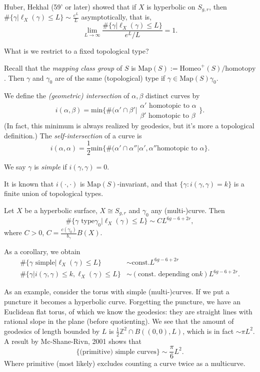 Huber, Hekhal (59' or later) showed that if
$X$ is hyperbolic
on $S_{g,r}$, then
$\#\{\gamma|\ell_X(\gamma)\leq L\}\sim
\frac{e^L}{L}$
asymptotically, that is,
$$
\lim_{L\to \infty}\frac{\#
\{\gamma|\ell_X(\gamma)\leq L\}}{e^L/L}=1.
$$

\medskip\noindent
What is we restrict to a fixed topological
type?

Recall that the {\it mapping class group} of
$S$ is
$\text{Map}(S):=\text{Homeo}^+(S)/
\text{homotopy}$.
Then $\gamma$ and $\gamma_0$ are of the same
(topological)
type if $\gamma \in \text{Map}(S)\gamma_0$.

We define the {\it (geometric) intersection}
of $\alpha,\beta$
distinct curves by
$$
i(\alpha,\beta)=\text{min}\{\#(\alpha' \cap
\beta'|
\substack{\alpha'\text{ homotopic to }\alpha
\\
\beta'\text{ homotopic to }\beta}\}.
$$
(In fact, this minimum is always realized by
geodesics,
but it's more a topological definition.)
The {\it self-intersection} of a curve is
$$
i(\alpha,\alpha)=\frac{1}{2}\text{min}
\{\#(\alpha' \cap
\alpha''|\alpha',\alpha''\text{
homotopic to }\alpha\}.
$$

We say $\gamma$ is {\it simple} if
$i(\gamma,\gamma)=0$.

It is known that $i(\cdot,\cdot)$ is
$\text{Map}(S)$-invariant,
and that $\{\gamma:i(\gamma,\gamma)=k\}$ is a
finite union
of topological types.

\begin{theorem}[Mirzakhani, '08, '16]
\label{theorem-mirzakhani}
Let $X$ be a hyperbolic surface, $X \cong
S_{g,r}$
and $\gamma_0$ any (multi-)curve.
Then
$$
\#\{\gamma\text{ type
}\gamma_0|\ell_X(\gamma)\leq L\}
\sim CL^{6g-6+2r},
$$
where $C>0$,
$C=\frac{c(\gamma_0)}{b_\gamma}B(X)$.
\end{theorem}

\noindent
As a corollary, we obtain
$$
\begin{aligned}
\#\{\gamma\text{ simple}|\ell_X(\gamma)\leq
L\}&
\sim\text{const.}L^{6g-6+2r}\\
\#\{\gamma|i(\gamma,\gamma)\leq
k,\ell_X(\gamma)\leq L\}
&\sim (\text{const. depending on
$k$})L^{6g-6+2r}.
\end{aligned}
$$

\medskip\noindent
As an example, consider the torus with simple
(multi-)curves.
If we put a puncture it becomes a hyperbolic
curve.
Forgetting the puncture, we have an Euclidean
flat torus,
of which we know the geodesics: they are
straight lines
with rational slope in the plane (before
quotienting).
We see that the amount of geodesics of length
bounded by $L$
is $\frac{1}{2}\mathbb{Z}^2 \cap B((0,0),L)$,
which is in
fact $\sim \pi L^2$.
A result by Mc-Shane-Rivn, 2001 shows that
 $$
\{\text{(primitive) simple curves}\}\sim
\frac{\pi}{6}L^2.
$$
Where primitive (most likely) excludes
counting
a curve twice as a multicurve.


